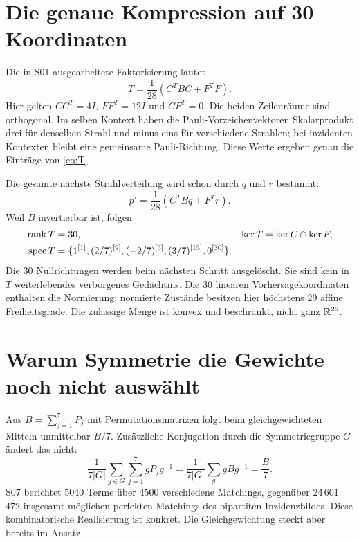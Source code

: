\section{Die genaue Kompression auf 30 Koordinaten}
Die in S01 ausgearbeitete Faktorisierung lautet
\begin{equation}
\boxed{T=\frac1{28}(C^TBC+F^TF).}
\label{eq:Tfactor}
\end{equation}
Hier gelten $CC^T=4I$, $FF^T=12I$ und $CF^T=0$. Die beiden Zeilenräume sind orthogonal. Im selben Kontext haben die Pauli-Vorzeichenvektoren Skalarprodukt drei für denselben Strahl und minus eins für verschiedene Strahlen; bei inzidenten Kontexten bleibt eine gemeinsame Pauli-Richtung. Diese Werte ergeben genau die Einträge von \eqref{eq:T}.

Die gesamte nächste Strahlverteilung wird schon durch $q$ und $r$ bestimmt:
\begin{equation}
p'=\frac1{28}(C^TBq+F^Tr).
\end{equation}
Weil $B$ invertierbar ist, folgen
\begin{align}
\operatorname{rank} T&=30,&\ker T&=\ker C\cap\ker F,\\
\operatorname{spec} T&=\{1^{[1]},(2/7)^{[9]},(-2/7)^{[5]},(3/7)^{[15]},0^{[30]}\}.
\end{align}
Die 30 Nullrichtungen werden beim nächsten Schritt ausgelöscht. Sie sind kein in $T$ weiterlebendes verborgenes Gedächtnis. Die 30 linearen Vorhersagekoordinaten enthalten die Normierung; normierte Zustände besitzen hier höchstens 29 affine Freiheitsgrade. Die zulässige Menge ist konvex und beschränkt, nicht ganz $\mathbb R^{29}$.

\section{Warum Symmetrie die Gewichte noch nicht auswählt}
Aus $B=\sum_{j=1}^7P_j$ mit Permutationsmatrizen folgt beim gleichgewichteten Mitteln unmittelbar $B/7$. Zusätzliche Konjugation durch die Symmetriegruppe $G$ ändert das nicht:
\begin{equation}
\frac1{7|G|}\sum_{g\in G}\sum_{j=1}^7gP_jg^{-1}
=\frac1{7|G|}\sum_g gBg^{-1}=\frac B7.
\end{equation}
S07 berichtet 5040 Terme über 4500 verschiedene Matchings, gegenüber 24\,601\,472 insgesamt möglichen perfekten Matchings des bipartiten Inzidenzbildes. Diese kombinatorische Realisierung ist konkret. Die Gleichgewichtung steckt aber bereits im Ansatz.

